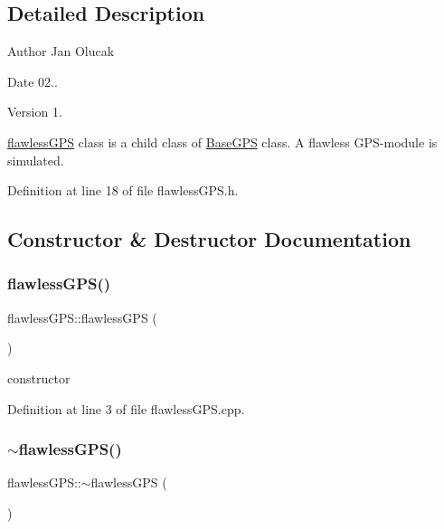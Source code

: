 \subsection{Detailed Description}
\begin{DoxyAuthor}{Author}
Jan Olucak 
\end{DoxyAuthor}
\begin{DoxyDate}{Date}
02.. 
\end{DoxyDate}
\begin{DoxyVersion}{Version}
1.
\end{DoxyVersion}
\hyperlink{classflawless_g_p_s}{flawless\+G\+PS} class is a child class of \hyperlink{class_base_g_p_s}{Base\+G\+PS} class. A flawless G\+P\+S-\/module is simulated. 

Definition at line 18 of file flawless\+G\+P\+S.\+h.



\subsection{Constructor \& Destructor Documentation}
\mbox{\label{classflawless_g_p_s_acf4fb3d275b9856b439f4f422184b740}} 
\subsubsection{\texorpdfstring{flawless\+G\+P\+S()}{flawlessGPS()}}
{\footnotesize\ttfamily flawless\+G\+P\+S\+::flawless\+G\+PS (\begin{DoxyParamCaption}{ }\end{DoxyParamCaption})}



constructor 



Definition at line 3 of file flawless\+G\+P\+S.\+cpp.

\mbox{\label{classflawless_g_p_s_a359e5a055ac23edc077ffbe5fdb171bf}} 
\subsubsection{\texorpdfstring{$\sim$flawless\+G\+P\+S()}{~flawlessGPS()}}
{\footnotesize\ttfamily flawless\+G\+P\+S\+::$\sim$flawless\+G\+PS (\begin{DoxyParamCaption}{ }\end{DoxyParamCaption})}



